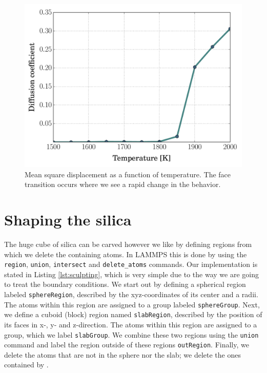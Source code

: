 \documentclass[twoside,english]{uiofysmaster}
\begin{document}
\begin{figure}
\centering
\includegraphics[width=0.7\linewidth]{../SiO2/msd/figures/msd}
\caption{Mean square displacement as a function of temperature. The face transition occurs where we see a rapid change in the behavior.}
\label{fig:msd}
\end{figure}






\section{Shaping the silica}


The huge cube of silica can be carved however we like by defining regions from which we delete the containing atoms. 
In LAMMPS this is done by using the \texttt{region}, \texttt{union}, \texttt{intersect} and \texttt{delete\_atoms} commands. 
Our implementation is stated in Listing \ref{lst:sculpting}, which is very simple due to the way we are going to treat the boundary conditions. We start out by defining a spherical region labeled \texttt{sphereRegion}, described by the xyz-coordinates of its center and a radii. The atoms within this region are assigned to a group labeled \texttt{sphereGroup}. 
Next, we define a cuboid (block) region named \texttt{slabRegion}, described by the position of its faces in x-, y- and z-direction. The atoms within this region are assigned to a group, which we label \texttt{slabGroup}.  
We combine these two regions using  the \texttt{union} command and label the region outside of these regions \texttt{outRegion}.
Finally, we delete the atoms that are not in the sphere nor the slab; we delete the ones contained by .
\end{document}
